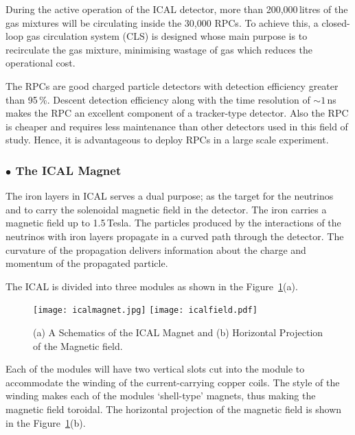 During the active operation of the ICAL detector, more than
200,000\,litres of the gas mixtures will be circulating inside the
30,000 RPCs. To achieve this, a closed-loop gas circulation system
(CLS) is designed whose main purpose is to recirculate the gas
mixture, minimising wastage of gas which reduces the operational cost.

The RPCs are good charged particle detectors with detection efficiency
greater than 95\,\%. Descent detection efficiency along with the time
resolution of $\sim 1$\,ns makes the RPC an excellent component of a
tracker-type detector.
Also the RPC is cheaper and requires less maintenance than other
detectors used in this field of study. Hence, it is advantageous
to deploy RPCs in a large scale experiment.

\subsubsection*{$\bullet$ The ICAL Magnet}
The iron layers in ICAL serves a dual purpose; as the target for the
neutrinos and to carry the solenoidal magnetic field in the
detector\cite{icalmagnet}. The iron carries a magnetic field up to
1.5\,Tesla. The particles produced by the interactions of the
neutrinos with iron layers propagate in a curved path through the
detector. The curvature of the propagation delivers information about
the charge and momentum of the propagated particle.

The ICAL is divided into three modules as shown in the
Figure~\ref{fig:magnet}(a). 
\begin{figure}[h]
  \centering
  \texttt{[image: icalmagnet.jpg]}
  \texttt{[image: icalfield.pdf]}
  \caption{(a) A Schematics of the ICAL Magnet and (b) Horizontal Projection of the Magnetic field\cite{icalmagnet}.}
  \label{fig:magnet}
\end{figure}
Each of the modules will have two vertical slots cut into the module
to accommodate the winding of the current-carrying copper coils. The
style of the winding makes each of the modules
`shell-type'\cite{transformer} magnets, thus making the magnetic field
toroidal. The horizontal projection of the magnetic field is shown in
the Figure~\ref{fig:magnet}(b).

